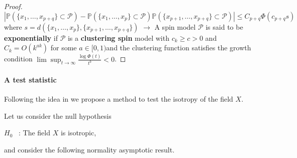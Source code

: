 \documentclass[12pt]{article}
\theoremstyle{Theorem}
\begin{document}
{\begin{proof}
$$|\mathbb{P}\left(\{x_{1}, \ldots, x_{p+q}\} \subset \mathcal{P}\right) - \mathbb{P}\left(\{x_{1}, \ldots, x_{p}\}\subset \mathcal{P}\right)\mathbb{P}\left(\{x_{p+1}, \ldots, x_{p+q}\}\subset \mathcal{P}\right)| \leq C_{p+q}\Phi\left(c_{p+q}s\right)$$
where $s = d\left(\{x_{1}, \ldots, x_{p}\}, \{x_{p+1}, \ldots, x_{p+q}\}\right)$
$\rightarrow$ A spin model $\mathcal{P}$ is said to be \textbf{exponentially} if $\mathcal{P}$ is a \textbf{clustering spin} model with $c_{k} \geq c > 0$ and $C_{k} = O(k^{ak})$ for some $a \in [0,1)$and the clustering function satisfies the growth condition $\lim\sup_{t\to \infty}\frac{\log\Phi(t)}{t^{b}} < 0$.
\end{proof}
\paragraph{A test statistic} Following the idea  in \cite{bierme2019}  we propose a method to test the isotropy of the field $X$.

Let us consider the null hypothesis
\begin{center}
  $H_{0}$ \, :\; The field $X$ is isotropic,
\end{center}
and consider the following normality asymptotic result.

}
\end{document}

